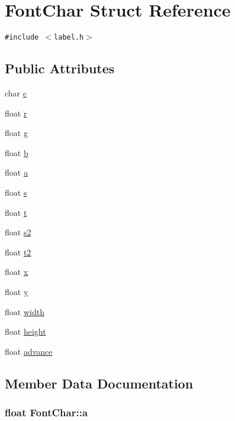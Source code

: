 \hypertarget{struct_font_char}{
\section{FontChar Struct Reference}
\label{struct_font_char}
}
{\tt \#include $<$label.h$>$}

\subsection*{Public Attributes}
\begin{CompactItemize}
\item 
char \hyperlink{struct_font_char_1a0616d4d1efcc2f7d99ec2ea9c7f6ab}{c}
\item 
float \hyperlink{struct_font_char_a589eae744644f1cbfe42384c2b1778a}{r}
\item 
float \hyperlink{struct_font_char_baf7443cdece35353073c830a6349dd5}{g}
\item 
float \hyperlink{struct_font_char_3a1b433eed368b71d1b2c012393ed1f8}{b}
\item 
float \hyperlink{struct_font_char_af18882a050a4cbe0f0c5a1b4d6c4785}{a}
\item 
float \hyperlink{struct_font_char_f5ba760fef65c655685788ba8b5ae0b4}{s}
\item 
float \hyperlink{struct_font_char_ac23c6cae613467cc64418e954b36aa0}{t}
\item 
float \hyperlink{struct_font_char_3458aeea19b4a82e52a72dc1e971e880}{s2}
\item 
float \hyperlink{struct_font_char_e9aa0990c6e59b8f601fadea844e95a7}{t2}
\item 
float \hyperlink{struct_font_char_51ed4677ce265c00a165eb6767fe3065}{x}
\item 
float \hyperlink{struct_font_char_380d101cfe1d31e8a47034b2dbf12dbf}{y}
\item 
float \hyperlink{struct_font_char_b849d58897a8433804531884014ebffe}{width}
\item 
float \hyperlink{struct_font_char_713f8b955b91876fa80fc8dfca2e5005}{height}
\item 
float \hyperlink{struct_font_char_cf84010ec5aed8408c30b07c673225a3}{advance}
\end{CompactItemize}


\subsection{Member Data Documentation}
\hypertarget{struct_font_char_af18882a050a4cbe0f0c5a1b4d6c4785}{
\subsubsection[{a}]{\setlength{\rightskip}{0pt plus 5cm}float {\bf FontChar::a}}}
\label{struct_font_char_af18882a050a4cbe0f0c5a1b4d6c4785}



